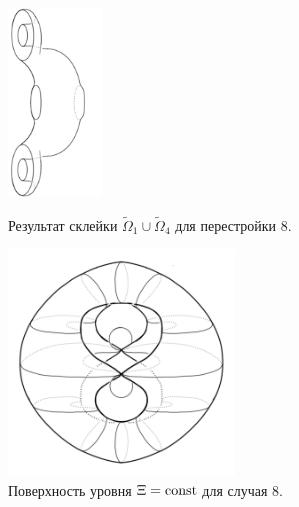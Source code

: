 %
%
\begin{figure}[!htb]
\centering
\includegraphics[width=2.5cm]{images/ch4/section2/atoms/atom_8_step.pdf}
    \caption{Результат склейки $\widetilde{\Omega}_1 \cup \widetilde{\Omega}_4$ для перестройки 8.}
    \label{fig:pt9:_atom_8_step}
\endminipage\hfill
{}
\centering
\includegraphics[width=6cm]{images/ch4/section2/atoms/atom_8.pdf}
    \caption{Поверхность уровня $\Xi = \mathrm{const}$ для случая 8.}
    \label{fig:pt9:_atom_8}
\endminipage\hfill
\end{figure}


